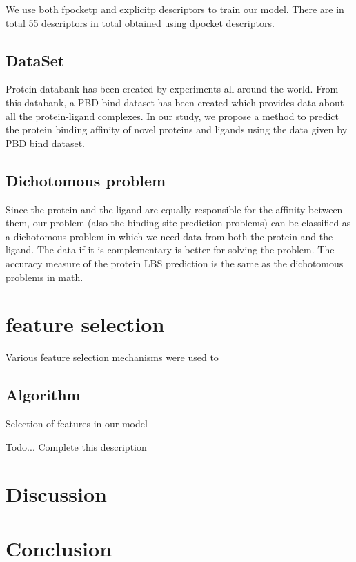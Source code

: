 \documentclass[11pt]{article}
\begin{document}
We use both fpocketp and explicitp descriptors to train our model.
There are in total 55 descriptors in total obtained using dpocket descriptors.

\subsection{DataSet}
Protein databank has been created by experiments all around the world.
From this databank, a PBD bind dataset has been created which provides data about all the protein-ligand complexes.
In our study, we propose a method to predict the protein binding affinity of novel proteins and ligands using the data given by PBD bind dataset.

\subsection{Dichotomous problem}
Since the protein and the ligand are equally responsible for the affinity between them, our problem (also the binding site prediction problems) can be classified as a dichotomous problem in which we need data from both
the protein and the ligand.
The data if it is complementary is better for solving the problem.
The accuracy measure of the protein LBS prediction is the same as the dichotomous problems in math.

\section{feature selection}
\label{fs}
Various feature selection mechanisms were used to

\subsection{Algorithm}

\begin{algorithm}
\caption{Selection of features in our model}
\begin{algorithmic}[1]
\State Todo... Complete this description
\EndProcedure
\end{algorithmic}
\end{algorithm}


\section{Discussion}


\section{Conclusion}



\end{document}
